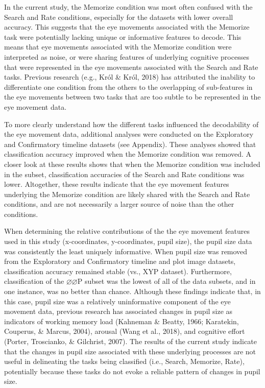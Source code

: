 \documentclass[
  english,
  man,floatsintext]{apa6}
\begin{document}
In the current study, the Memorize condition was most often confused with the Search and Rate conditions, especially for the datasets with lower overall accuracy. This suggests that the eye movements associated with the Memorize task were potentially lacking unique or informative features to decode. This means that eye movements associated with the Memorize condition were interpreted as noise, or were sharing features of underlying cognitive processes that were represented in the eye movements associated with the Search and Rate tasks. Previous research (e.g., Król \& Król, 2018) has attributed the inability to differentiate one condition from the others to the overlapping of sub-features in the eye movements between two tasks that are too subtle to be represented in the eye movement data.

To more clearly understand how the different tasks influenced the decodability of the eye movement data, additional analyses were conducted on the Exploratory and Confirmatory timeline datasets (see Appendix). These analyses showed that classification accuracy improved when the Memorize condition was removed. A closer look at these results shows that when the Memorize condition was included in the subset, classification accuracies of the Search and Rate conditions was lower. Altogether, these results indicate that the eye movement features underlying the Memorize condition are likely shared with the Search and Rate conditions, and are not necessarily a larger source of noise than the other conditions.

When determining the relative contributions of the the eye movement features used in this study (x-coordinates, y-coordinates, pupil size), the pupil size data was consistently the least uniquely informative. When pupil size was removed from the Exploratory and Confirmatory timeline and plot image datasets, classification accuracy remained stable (vs., XYP dataset). Furthermore, classification of the \(\varnothing\varnothing\)P subset was the lowest of all of the data subsets, and in one instance, was no better than chance. Although these findings indicate that, in this case, pupil size was a relatively uninformative component of the eye movement data, previous research has associated changes in pupil size as indicators of working memory load (Kahneman \& Beatty, 1966; Karatekin, Couperus, \& Marcus, 2004), arousal (Wang et al., 2018), and cognitive effort (Porter, Troscianko, \& Gilchrist, 2007). The results of the current study indicate that the changes in pupil size associated with these underlying processes are not useful in delineating the tasks being classified (i.e., Search, Memorize, Rate), potentially because these tasks do not evoke a reliable pattern of changes in pupil size.
\end{document}
